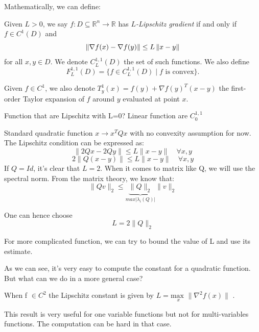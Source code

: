 Mathematically, we can define: 

\begin{definition}
Given $L>0$, we say $f : D \subseteq \mathbb{R}^n \to \mathbb{R}$ has \emph{$L$-Lipschitz gradient} if and only if $f \in C^1(D)$ and
\begin{equation*}
\left\Vert \nabla f(x) - \nabla f(y) \right\Vert \le L \left\Vert x-y \right\Vert
\end{equation*}
for all $x,y \in D$. We denote $C_L^{1,1}(D)$ the set of such functions. We also define
\begin{equation*}
F_L^{1,1}(D) = \{ f \in C_L^{1,1}(D) \mid f \text{ is convex}\} .
\end{equation*}
\end{definition}

Given $f \in C^1$, we also denote $T^1_y(x) = f(y) + \nabla f(y)^T (x-y)$ the first-order Taylor expansion of $f$ around $y$ evaluated at point $x$.


\begin{example}\begin{leftbar}
Function that are Lipschitz with L=0? Linear function are $C_0^{1,1}$
\end{leftbar}\end{example}

\begin{example}\begin{leftbar}
Standard quadratic function $x \rightarrow x^T Q x $  with no convexity assumption for now. The Lipschitz condition can be expressed as: 
$$ \| 2Qx - 2Qy \| \leq L \| x-y \|  \quad \forall x,y$$
$$ 2 \| Q (x -y)  \| \leq L \| x-y \| \quad \forall x,y$$
If $Q=Id$, it's clear that $L = 2$.  When it comes to matrix like Q, we will use the spectral norm. From the matrix theory, we  know that:
$$ \| Qv \|_2 \leq \underbrace{\| Q\| _2}_{max \vert \lambda_i (Q) \vert} \| v \|_2$$

One can hence choose $$L=2 \| Q \|_2 $$

For more complicated function, we can try to bound the value of L  and use  its estimate. 
\end{leftbar}\end{example}

As we can see, it's very easy to compute the constant for a quadratic function. But what can we do in a more  general case?\\

\begin{property} 
When f  $ \in C^2$ the Lipschitz constant is given by $ L=\underset{x}{\text{max }} \| \nabla^2 f(x) \|$ .
\label{5:prop1}
\end{property}
This result is very useful for one variable functions but not for multi-variables functions. The computation can be hard in that case.

